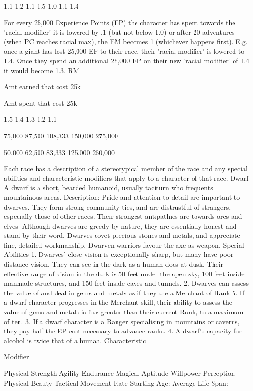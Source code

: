 \documentclass[a4paper]{article}
\begin{document}
\begin{multicols}{3}
1.1
1.2
1.1
1.5
1.0
1.1
1.4

For every 25,000 Experience Points (EP) the character has spent towards the 'racial modifier' it is
lowered by .1 (but not below 1.0) or after 20 adventures (when PC reaches racial max), the EM
becomes 1 (whichever happens first). E.g. once a
giant has lost 25,000 EP to their race, their 'racial
modifier' is lowered to 1.4. Once they spend an
additional 25,000 EP on their new 'racial modifier'
of 1.4 it would become 1.3.
RM

Amt earned
that cost 25k

Amt spent
that cost 25k

1.5
1.4
1.3
1.2
1.1

75,000
87,500
108,333
150,000
275,000

50,000
62,500
83,333
125,000
250,000

Each race has a description of a stereotypical
member of the race and any special abilities and
characteristic modifiers that apply to a character of that race.
Dwarf
A dwarf is a short, bearded humanoid, usually
taciturn who frequents mountainous areas.
Description: Pride and attention to detail are important to dwarves. They form strong community
ties, and are distrustful of strangers, especially
those of other races. Their strongest antipathies are
towards orcs and elves. Although dwarves are
greedy by nature, they are essentially honest and
stand by their word. Dwarves covet precious stones
and metals, and appreciate fine, detailed workmanship. Dwarven warriors favour the axe as weapon.
Special Abilities
1. Dwarves’ close vision is exceptionally sharp, but
many have poor distance vision. They can see in
the dark as a human does at dusk. Their effective
range of vision in the dark is 50 feet under the open
sky, 100 feet inside manmade structures, and 150
feet inside caves and tunnels.
2. Dwarves can assess the value of and deal in
gems and metals as if they are a Merchant of Rank
5. If a dwarf character progresses in the Merchant
skill, their ability to assess the value of gems and
metals is five greater than their current Rank, to a
maximum of ten.
3. If a dwarf character is a Ranger specialising in
mountains or caverns, they pay half the EP cost
necessary to advance ranks.
4. A dwarf’s capacity for alcohol is twice that of a
human.
Characteristic

Modifier

Physical Strength
Agility
Endurance
Magical Aptitude
Willpower
Perception
Physical Beauty
Tactical Movement Rate
Starting Age:
Average Life Span:


\end{multicols}
\end{document}
